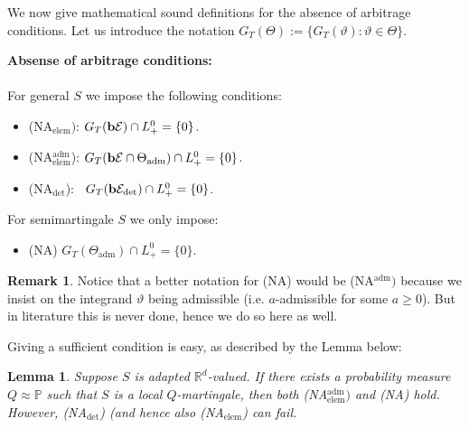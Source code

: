 \documentclass[12pt,a4paper, twoside]{article}
\newtheorem{lem}{Lemma}[section]
\theoremstyle{definition}
\newtheorem{rem}{Remark}[section]
\newcommand{\PP}{\mathbb{P}} %
\newcommand{\simple}{\textbf{\text{b}}\mathcal{E}}
\newcommand{\verysimple}{\textbf{\text{b}}\mathcal{E}_{\text{det}}}
\begin{document}
\newpage
We now give mathematical sound definitions for the absence of arbitrage conditions. Let us introduce the notation $G_T( \Theta):= \{ G_T( \vartheta) : \vartheta \in \Theta\}$.
\begin{mdframed}[backgroundcolor=yellow!20, topline=true, linewidth=2.0pt] \textbf{Absense of arbitrage conditions:}\\
\\
For general $S$ we impose the following conditions:
\begin{itemize}
\item (NA$_{\text{elem}})$: $G_T(\simple) \cap L_+^0 = \{ 0 \}$. 
\item (NA$_{\text{elem}}^\text{adm}$): $G_T(\simple \cap \Theta_\text{adm}) \cap L_+^0 = \{0\}$. 
\item (NA$_\text{det}$): \ $G_T(\verysimple) \cap L_+^0 = \{0\}$.
\end{itemize}
For semimartingale $S$ we only impose:
\begin{itemize}
\item (NA) $G_T( \Theta_\text{adm}) \cap L_+^0 = \{0 \}$. 
\end{itemize}
\end{mdframed}
\begin{rem} Notice that a better notation for (NA) would be (NA$^\text{adm})$ because we insist on the integrand $\vartheta$ being admissible (i.e. $a$-admissible for some $a \geq 0$). But in literature this is never done, hence we do so here as well. 
\end{rem}
Giving a sufficient condition is easy, as described by the Lemma below: 
\begin{lem} \label{L21} Suppose $S$ is adapted $\mathbb{R}^d$-valued. If there exists a probability measure $Q \approx \PP$ such that $S$ is a local $Q$-martingale, then both (NA$_\text{elem}^\text{adm})$ and (NA) hold. However, (NA$_\text{det}$) (and hence also (NA$_\text{elem}$) can fail. 
\end{lem}
\end{document}
